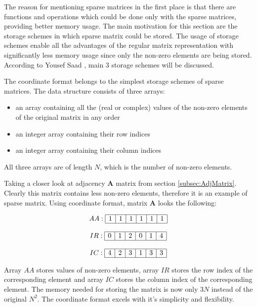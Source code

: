 \documentclass[thesis=M,english]{FITthesis}[2012/10/20]
\begin{document}
The reason for mentioning sparse matrices in the first place is that there are functions and operations which could be done only with the sparse matrices, providing better memory usage. The main motivation for this section are the storage schemes in which sparse matrix could be stored. The usage of storage schemes enable all the advantages of the regular matrix representation with significantly less memory usage since only the non-zero elements are being stored. According to Yousef Saad \cite{Saad03}, main 3 storage schemes will be discussed. 

The coordinate format belongs to the simplest storage schemes of sparse matrices. The data structure consists of three arrays: 
\begin{itemize}
\item an array containing all the (real or complex) values of the non-zero elements of the original matrix in any order
\item an integer array containing their row indices 
\item an integer array containing their column indices
\end{itemize}
All three arrays are of length $N$, which is the number of non-zero elements.

Taking a closer look at adjacency $\textbf{A}$ matrix from section \ref{subsec:AdjMatrix}. Clearly this matrix contains less non-zero elements, therefore it is an example of sparse matrix. Using coordinate format, matrix $\textbf{A}$ looks the following:

$$
\begin{array}{c}

AA:
\begin{array}{|c|c|c|c|c|c|}
 \hline
 1 & 1 & 1 & 1 & 1 & 1 \\
 \hline
\end{array}
\\ \\
IR:
\begin{array}{|c|c|c|c|c|c|}
 \hline
 0 & 1 & 2 & 0 & 1 & 4 \\
 \hline
\end{array}
\\ \\
IC:
\begin{array}{|c|c|c|c|c|c|}
 \hline
 4 & 2 & 3 & 1 & 3 & 3 \\
 \hline
\end{array}
\end{array}
$$

Array $AA$ stores values of non-zero elements, array $IR$ stores the row index of the corresponding element and array $IC$ stores the column index of the corresponding element. The memory needed for storing the matrix is now only $3N$ instead of the original $N^2$.  The coordinate format excels with it's simplicity and flexibility.
\end{document}
